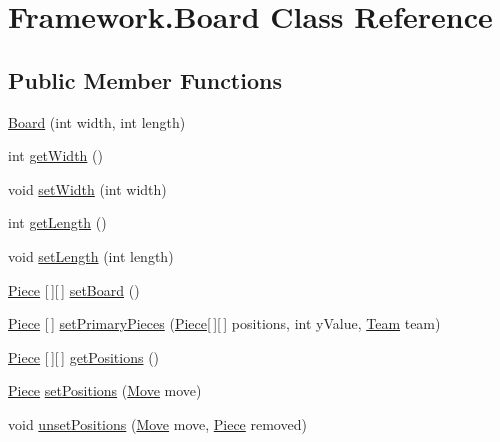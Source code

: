 \hypertarget{class_framework_1_1_board}{}\section{Framework.\+Board Class Reference}
\label{class_framework_1_1_board}
\subsection*{Public Member Functions}
\begin{DoxyCompactItemize}
\item 
\hyperlink{class_framework_1_1_board_a2738a7191b7eed3385d092c60c23a2e1}{Board} (int width, int length)
\item 
int \hyperlink{class_framework_1_1_board_a926863b1b61235e17043cc12ce8d00ac}{get\+Width} ()
\item 
void \hyperlink{class_framework_1_1_board_a64aa58f14e9a19bb896861976fbeff2a}{set\+Width} (int width)
\item 
int \hyperlink{class_framework_1_1_board_a208745491f96b28d4f3ec8cbbb55b657}{get\+Length} ()
\item 
void \hyperlink{class_framework_1_1_board_a769180cd9bd18fb08aa47a31892714e2}{set\+Length} (int length)
\item 
\hyperlink{class_framework_1_1_pieces_1_1_piece}{Piece} \mbox{[}$\,$\mbox{]}\mbox{[}$\,$\mbox{]} \hyperlink{class_framework_1_1_board_aa2f8d03b279e53a5a75762667d9b9f9f}{set\+Board} ()
\item 
\hyperlink{class_framework_1_1_pieces_1_1_piece}{Piece} \mbox{[}$\,$\mbox{]} \hyperlink{class_framework_1_1_board_a4763df9b54c84113603faf7cf0372b83}{set\+Primary\+Pieces} (\hyperlink{class_framework_1_1_pieces_1_1_piece}{Piece}\mbox{[}$\,$\mbox{]}\mbox{[}$\,$\mbox{]} positions, int y\+Value, \hyperlink{class_framework_1_1_team}{Team} team)
\item 
\hyperlink{class_framework_1_1_pieces_1_1_piece}{Piece} \mbox{[}$\,$\mbox{]}\mbox{[}$\,$\mbox{]} \hyperlink{class_framework_1_1_board_af250d25ffe26de66b28abb81fa3f741b}{get\+Positions} ()
\item 
\hyperlink{class_framework_1_1_pieces_1_1_piece}{Piece} \hyperlink{class_framework_1_1_board_a1253153abd89d5ec2556dda59497fa43}{set\+Positions} (\hyperlink{class_framework_1_1_move}{Move} move)
\item 
void \hyperlink{class_framework_1_1_board_a9011996b5b797378ba6bf5ee295790d8}{unset\+Positions} (\hyperlink{class_framework_1_1_move}{Move} move, \hyperlink{class_framework_1_1_pieces_1_1_piece}{Piece} removed)

\end{DoxyCompactItemize}
